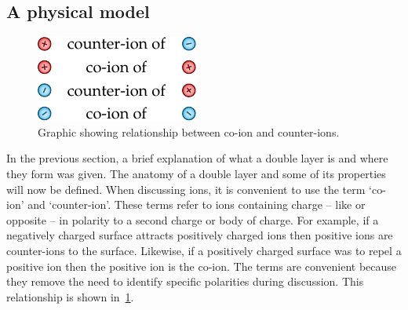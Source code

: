

  \subsection{A physical model}
    \label{sub:background_doubleLayers_physicalModel}


    \begin{figure}
      \begin{center}
        \includegraphics{content/introduction/graphics/counterAndCoIons}
      \end{center}
      \caption{Graphic showing relationship between co-ion and counter-ions.}
      \label{fig:counterAndCoIons}
    \end{figure}
    In the previous section, a brief explanation of what a double layer is and where they form was given.
    The anatomy of a double layer and some of its properties will now be defined.
    When discussing ions, it is convenient to use the  term `co-ion' and `counter-ion'.
    These terms refer to ions containing charge -- like or opposite -- in polarity to a second charge or body of charge.
    For example, if a negatively charged surface attracts positively charged ions then positive ions are counter-ions to the surface.
    Likewise, if a positively charged surface was to repel a positive ion then the positive ion is the co-ion.
    The terms are convenient because they remove the need to identify specific polarities during discussion.
    This relationship is shown in~\cref{fig:counterAndCoIons}.


